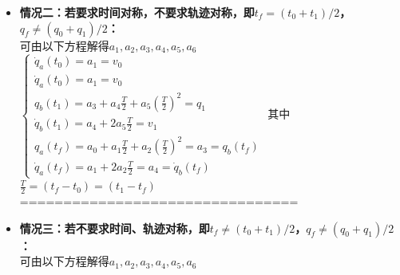 \documentclass[../main.tex]{subfiles}
\begin{document}
\begin{enumerate}
\begin{enumerate}
{\begin{itemize}
\begin{enumerate}
                    \item \textbf{始末速度：}
                        \begin{itemize}
                            \item 若 $v_0=v_1$，则在 $t_f$ 处速度连续；
                            \item 若 $v_0\neq v_1$，则在 $t_f$ 处速度不连续；
                        \end{itemize}
                \end{enumerate}
            \\================================   
             \item \textbf{情况二：若要求时间对称，不要求轨迹对称，即$t_f=(t_0+t_1)/2$，$q_f\neq(q_0+q_1)/2$：}
             \\可由以下方程解得$a_1,a_2,a_3,a_4,a_5,a_6$
            \( \left\{  \begin{array}{l} {\dot{q}}_{a}\left( {t}_{0}\right)  = {a}_{1} = {v}_{0} \\  {\dot{q}}_{a}\left( {t}_{0}\right)  = {a}_{1} = {v}_{0} \\  {q}_{b}\left( {t}_{1}\right)  = {a}_{3} + {a}_{4}\frac{T}{2} + {a}_{5}{\left( \frac{T}{2}\right) }^{2} = {q}_{1} \\  {\dot{q}}_{b}\left( {t}_{1}\right)  = {a}_{4} + 2{a}_{5}\frac{T}{2} = {v}_{1} \\  {q}_{a}\left( {t}_{f}\right)  = {a}_{0} + {a}_{1}\frac{T}{2} + {a}_{2}{\left( \frac{T}{2}\right) }^{2} = {a}_{3} = {q}_{b}\left( t_f\right) \\  {\dot{q}}_{a}\left( {t}_{f}\right)  = {a}_{1} + 2{a}_{2}\frac{T}{2} = {a}_{4} = {\dot{q}}_{b}\left( {t}_{f}\right)  \end{array}\right. \)
            其中 \( \frac{T}{2} = \left( {{t}_{f} - {t}_{0}}\right)  = \left( {{t}_{1} - {t}_{f}}\right) \)
            \\================================   
             \item \textbf{情况三：若不要求时间、轨迹对称，即$t_f\neq(t_0+t_1)/2$，$q_f\neq(q_0+q_1)/2$：}             
            \\可由以下方程解得$a_1,a_2,a_3,a_4,a_5,a_6$

\end{itemize}}
\end{enumerate}
\end{enumerate}
\end{document}
